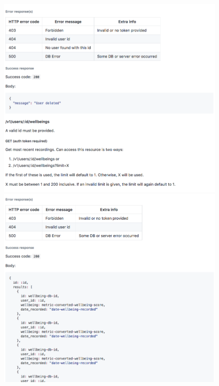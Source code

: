 \documentclass[11pt,openright,a4paper]{report}
\begin{document}
\begin{appendices}
\begin{figure}[ht]
  \centering
  \includegraphics[width=.9\textwidth]{i/apidocs9.png}
  \includegraphics[width=.9\textwidth]{i/apidocs10.png}
\end{figure}


\end{appendices}
\end{document}
